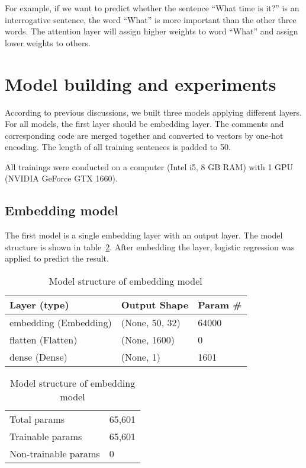 \documentclass[runningheads]{llncs}
\begin{document}
For example, if we want to predict whether the sentence ``What time is it?'' is an interrogative sentence, the word ``What'' is more important than the other three words. The attention layer will assign higher weights to word ``What'' and assign lower weights to others.


\section{Model building and experiments}\label{chapter:building}
According to previous discussions, we built three models applying different layers. For all models, the first layer should be embedding layer. The comments and corresponding code are merged together and converted to vectors by one-hot encoding. The length of all training sentences is padded to 50.

All trainings were conducted on a computer (Intel i5, 8 GB RAM) with 1 GPU (NVIDIA GeForce GTX 1660).

\subsection{Embedding model}
The first model is a single embedding layer with an output layer. The model structure is shown in table~\ref{tab:embedding-table}.
After embedding the layer, logistic regression was applied to predict the result.

\begin{table}
\centering
\begin{tabular}{|l|l|l|}
\hline
\rowcolor[HTML]{C0C0C0} 
\textbf{Layer (type)} & \textbf{Output Shape} & \textbf{Param \#} \\ \hline
embedding (Embedding) & (None, 50, 32) & 64000 \\ \hline
flatten (Flatten) & (None, 1600) & 0 \\ \hline
dense (Dense) & (None, 1) & 1601 \\ \hline
\end{tabular}
\caption{Model structure of embedding model}
\label{tab:embedding-table}

\begin{tabular}{ll}
Total params & 65,601 \\
Trainable params & 65,601 \\
Non-trainable params & 0
\end{tabular}
\end{table}
\end{document}
